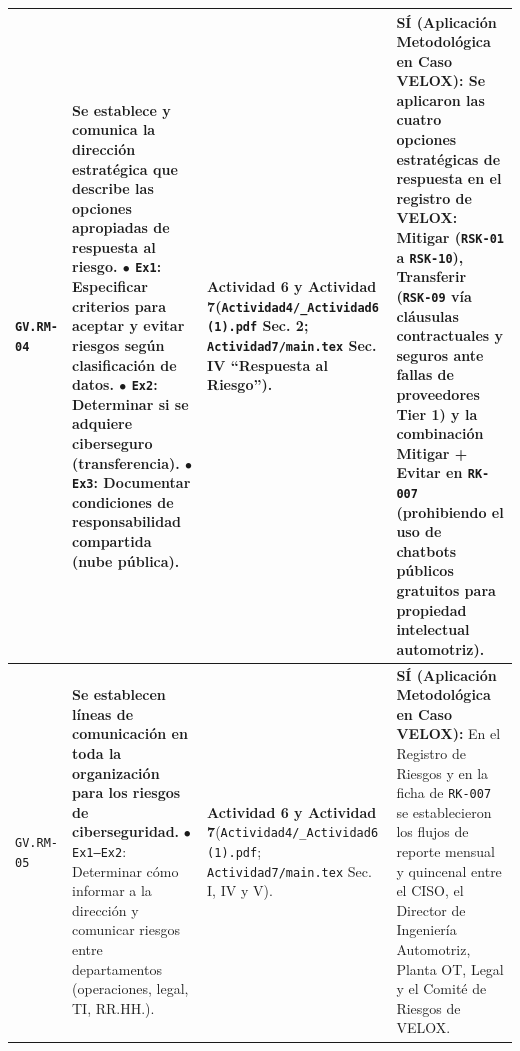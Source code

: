 \documentclass[letterpaper,11pt]{article}
\begin{document}
\begin{longtable}{|C{1.5cm}|L{5.3cm}|L{4.3cm}|L{5.8cm}|}
\texttt{GV.RM-04} &
\textbf{Se establece y comunica la dirección estratégica que describe las opciones apropiadas de respuesta al riesgo.}\newline
$\bullet$ \texttt{Ex1}: Especificar criterios para aceptar y evitar riesgos según clasificación de datos.\newline
$\bullet$ \texttt{Ex2}: Determinar si se adquiere ciberseguro (transferencia).\newline
$\bullet$ \texttt{Ex3}: Documentar condiciones de responsabilidad compartida (nube pública). &
\textbf{Actividad 6 y Actividad 7}\newline (\texttt{Actividad4/\_Actividad6 (1).pdf} Sec. 2; \texttt{Actividad7/main.tex} Sec. IV ``Respuesta al Riesgo''). &
\textbf{SÍ (Aplicación Metodológica en Caso VELOX):}\newline
Se aplicaron las cuatro opciones estratégicas de respuesta en el registro de VELOX: \textbf{Mitigar} (\texttt{RSK-01} a \texttt{RSK-10}), \textbf{Transferir} (\texttt{RSK-09} vía cláusulas contractuales y seguros ante fallas de proveedores Tier 1) y la combinación \textbf{Mitigar + Evitar} en \texttt{RK-007} (prohibiendo el uso de chatbots públicos gratuitos para propiedad intelectual automotriz). \\
\hline

\texttt{GV.RM-05} &
\textbf{Se establecen líneas de comunicación en toda la organización para los riesgos de ciberseguridad.}\newline
$\bullet$ \texttt{Ex1--Ex2}: Determinar cómo informar a la dirección y comunicar riesgos entre departamentos (operaciones, legal, TI, RR.HH.). &
\textbf{Actividad 6 y Actividad 7}\newline (\texttt{Actividad4/\_Actividad6 (1).pdf}; \texttt{Actividad7/main.tex} Sec. I, IV y V). &
\textbf{SÍ (Aplicación Metodológica en Caso VELOX):}\newline
En el Registro de Riesgos y en la ficha de \texttt{RK-007} se establecieron los flujos de reporte mensual y quincenal entre el CISO, el Director de Ingeniería Automotriz, Planta OT, Legal y el Comité de Riesgos de VELOX. \\
\hline


\end{longtable}
\end{document}
